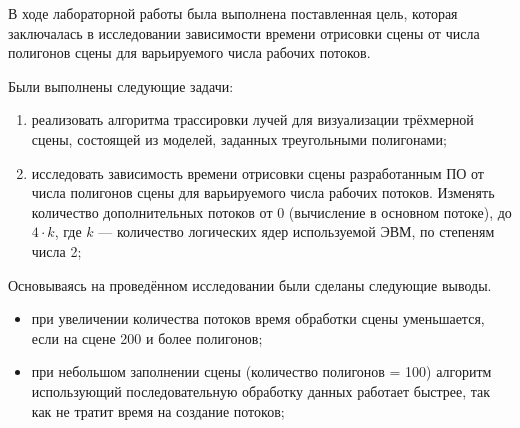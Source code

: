 
В ходе лабораторной работы была выполнена поставленная цель, которая заключалась в исследовании зависимости времени отрисовки сцены от числа полигонов сцены для варьируемого числа рабочих потоков.


Были выполнены следующие задачи:
\begin{enumerate}
	\item реализовать алгоритма трассировки лучей для визуализации трёхмерной сцены, состоящей из моделей, заданных треугольными полигонами;
	\item исследовать зависимость времени отрисовки сцены разработанным ПО от числа полигонов сцены для варьируемого числа рабочих потоков. Изменять количество дополнительных потоков от 0 (вычисление в основном потоке), до $4\cdot k$, где $k$ --- количество логических ядер используемой ЭВМ, по степеням числа 2;
\end{enumerate}


Основываясь на проведённом исследовании были сделаны следующие выводы.
\begin{itemize}
	\item{при увеличении количества потоков время обработки сцены уменьшается, если на сцене 200 и более полигонов;}
	\item{при небольшом заполнении сцены (количество полигонов = 100) алгоритм использующий последовательную обработку данных работает быстрее, так как не тратит время на создание потоков;}
\end{itemize}
